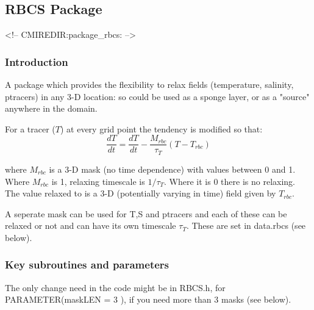\subsection {RBCS Package} 
\label{sec:pkg:rbcs}
\begin{rawhtml}
<!-- CMIREDIR:package_rbcs: -->
\end{rawhtml}

\subsubsection {Introduction}

A package which provides the flexibility
to relax fields (temperature, salinity, ptracers)
in any 3-D location:
so could be used as a sponge layer, or as a
"source" anywhere in the domain.

\noindent
For a tracer ($T$) at every grid point the tendency is modified so that:
\[
\frac{dT}{dt}=\frac{dT}{dt} - \frac{M_{rbc}}{\tau_T} (T-T_{rbc})
\]

\noindent
where $M_{rbc}$ is a 3-D mask (no time dependence) with
values between 0 and 1. Where $M_{rbc}$ is 1, relaxing timescale
is $1/\tau_T$. Where it is 0 there is no relaxing.
The value relaxed to is a 3-D (potentially varying in
time) field given by $T_{rbc}$. 

A seperate mask can be used for T,S and ptracers and
each of these
can be relaxed or not and can have its own timescale
$\tau_T$. These are set in data.rbcs (see below).

\subsubsection {Key subroutines and parameters}

The only change need in the code might be in {RBCS.h}, for
PARAMETER(maskLEN = 3 ), if you need more than 3
masks (see below).

\vspace{.5cm}

